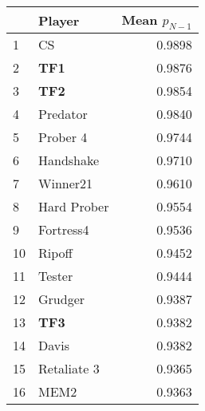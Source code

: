 \begin{tabular}{llr}
\toprule
{} &       Player &  Mean $p_{N-1}$ \\
\midrule
1  &           CS &          0.9898 \\
2  &          \textbf{TF1} &          0.9876 \\
3  &          \textbf{TF2} &          0.9854 \\
4  &     Predator &          0.9840 \\
5  &     Prober 4 &          0.9744 \\
6  &    Handshake &          0.9710 \\
7  &     Winner21 &          0.9610 \\
8  &  Hard Prober &          0.9554 \\
9  &    Fortress4 &          0.9536 \\
10 &       Ripoff &          0.9452 \\
11 &       Tester &          0.9444 \\
12 &      Grudger &          0.9387 \\
13 &          \textbf{TF3} &          0.9382 \\
14 &        Davis &          0.9382 \\
15 &  Retaliate 3 &          0.9365 \\
16 &         MEM2 &          0.9363 \\
\bottomrule
\end{tabular}
